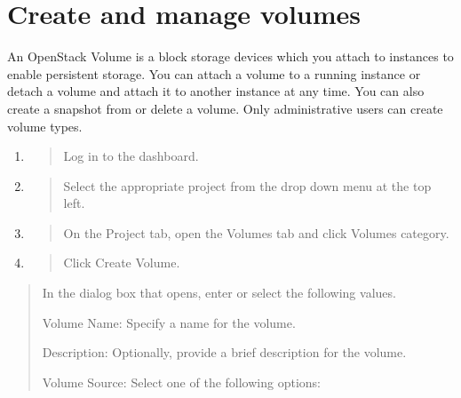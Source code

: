 \chapter{Create and manage volumes}

An \gls{OpenStack Volume} is a block storage devices which you attach to instances to enable persistent storage. You can attach a volume to a running instance or
detach a volume and attach it to another instance at any time. You can
also create a snapshot from or delete a volume. Only administrative
users can create volume types.

\label{create-a-volume}

\begin{enumerate}
\def\labelenumi{\arabic{enumi}.}
\item
  \begin{quote}
  Log in to the dashboard.
  \end{quote}
\item
  \begin{quote}
  Select the appropriate project from the drop down menu at the top
  left.
  \end{quote}
\item
  \begin{quote}
  On the Project tab, open the Volumes tab and click Volumes category.
  \end{quote}
\item
  \begin{quote}
  Click Create Volume.
  \end{quote}
\end{enumerate}

\begin{quote}
In the dialog box that opens, enter or select the following values.

Volume Name: Specify a name for the volume.

Description: Optionally, provide a brief description for the volume.

Volume Source: Select one of the following options:
\end{quote}

